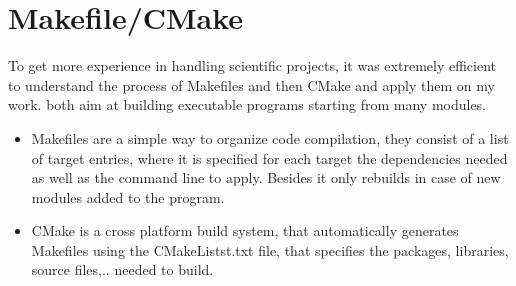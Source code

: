 \section{Makefile/CMake}
To get more experience in handling scientific projects, it was extremely efficient to understand the process of Makefiles and then CMake and apply them on my work. both aim at building executable programs starting from many modules.
\begin{itemize}
\item Makefiles are a simple way to organize code compilation, they consist of a list of target entries, where it is specified for each target the dependencies needed as well as the command line to apply. Besides it only rebuilds in case of new modules added to the program.
\item CMake is a cross platform build system, that automatically generates Makefiles using the CMakeListst.txt file, that specifies the packages, libraries, source files,.. needed to build.
\end{itemize}  
